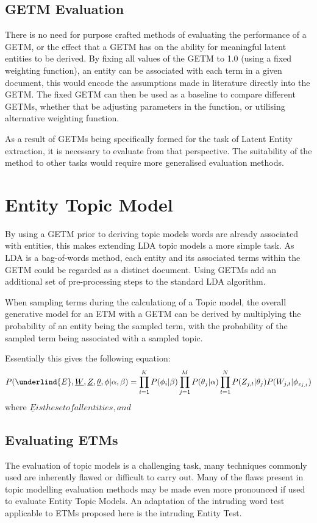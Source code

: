 \documentclass[10pt]{report}
\begin{document}
\subsection{GETM Evaluation}
There is no need for purpose crafted methods of evaluating the performance of a GETM, or the effect that a GETM has on the ability for meaningful latent entities to be derived. By fixing all values of the GETM to 1.0 (using a fixed weighting function), an entity can be associated with each term in a given document, this would encode the assumptions made in literature directly into the GETM. The fixed GETM can then be used as a baseline to compare different GETMs, whether that be adjusting parameters in the function, or utilising alternative weighting function.

As a result of GETMs being specifically formed for the task of Latent Entity extraction, it is necessary to evaluate from that perspective. The suitability of the method to other tasks would require more generalised evaluation methods.

\section{Entity Topic Model}
By using a GETM prior to deriving topic models words are already associated with entities, this makes extending LDA topic models a more simple task. As LDA is a bag-of-words method, each entity and its associated terms within the GETM could be regarded as a distinct document. Using GETMs add an additional set of pre-processing steps to the standard LDA algorithm.

When sampling terms during the calculationg of a Topic model, the overall generative model for an ETM with a GETM can be derived by multiplying the probability of an entity being the sampled term, with the probability of the sampled term being associated with a sampled topic.

Essentially this gives the following equation:
\[
  P(\underlind{E},\underline{W},\underline{Z},\underline{\theta},\phi|\alpha,\beta) = \prod^{K}_{i=1} P(\phi_i|\beta) \prod^{M}_{j=1} P(\theta_j|\alpha)\prod^{N}_{t=1} P(Z_{j,t} | \theta_j)P(W_{j,t} | \phi_{z_{j,t}})
\]
where \(\underline{E} is the set of all entities, and \)

\subsection{Evaluating ETMs}
The evaluation of topic models is a challenging task, many techniques commonly used are inherently flawed or difficult to carry out. Many of the flaws present in topic modelling evaluation methods may be made even more pronounced if used to evaluate Entity Topic Models. An adaptation of the intruding word test applicable to ETMs proposed here is the intruding Entity Test.
\end{document}
